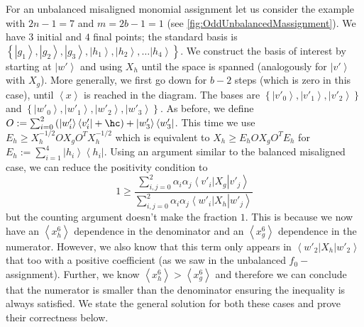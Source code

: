 \documentclass{theoretics}
\newcommand{\atul}[1]{#1} %
\begin{document}
For an
unbalanced misaligned monomial assignment let us consider the example with $2n-1=7$
and $m=2b-1=1$ \atul{(see  \cref{fig:OddUnbalancedMassignment})}. We have $3$ initial and $4$
final points; the standard basis is\\ $\left\{ \left|g_{1}\right\rangle ,\left|g_{2}\right\rangle ,\left|g_{3}\right\rangle ,\left|h_{1}\right\rangle ,\left|h_{2}\right\rangle ,\dots\left|h_{4}\right\rangle \right\}$.
We construct the basis of interest by starting at
$\left|w'\right\rangle $
and using $X_{h}$ until the space is spanned (analogously for $\left|v'\right\rangle $ with $X_g$). More generally, we
first go down for $b-2$ steps (which is zero in this case), until
$\left\langle x\right\rangle $ is reached in the diagram. The bases
are $\left\{ \left|v'_{0}\right\rangle ,\left|v'_{1}\right\rangle ,\left|v'_{2}\right\rangle \right\} $
and $\left\{ \left|w'_{0}\right\rangle ,\left|w'_{1}\right\rangle ,\left|w'_{2}\right\rangle ,\left|w'_{3}\right\rangle \right\} $.
As before, we define $O:=\sum_{i=0}^{2}\left(\left|w'_{i}\right\rangle \left\langle v'_{i}\right|+\hc\right)+\left|w'_{3}\right\rangle \left\langle w'_{3}\right|$.
This time we
use $E_{h}\ge X_{h}^{-1/2}OX_{g}O^{T}X_{h}^{-1/2}$ which is equivalent
to $X_{h}\ge E_{h}OX_{g}O^{T}E_{h}$ for $E_{h}:=\sum_{i=1}^{4}\left|h_{i}\right\rangle \left\langle h_{i}\right|$.
Using an argument similar to the balanced misaligned case, we can
reduce the positivity condition to
\begin{displaymath}
  1\ge\frac{\sum_{i,j=0}^{2}\alpha_{i}\alpha_{j}\left\langle v'_{i}\right|X_{g}\left|v'_{j}\right\rangle }{\sum_{i,j=0}^{2}\alpha_{i}\alpha_{j}\left\langle w'_{i}\right|X_{h}\left|w'_{j}\right\rangle }
\end{displaymath}
but the counting argument doesn't make the fraction $1$. This is
because we now have an $\left\langle x_{h}^{6}\right\rangle $ dependence
in the denominator and an $\left\langle x_{g}^{6}\right\rangle $ dependence
in the numerator. However, we also know that this term only appears
in $\left\langle w'_{2}\right|X_{h}\left|w'_{2}\right\rangle $ that
too with a positive coefficient (as we saw in the unbalanced $f_{0}-$assignment). Further, we know $\left\langle x_{h}^{6}\right\rangle >\left\langle x_{g}^{6}\right\rangle $
and therefore we can conclude that the numerator is smaller than the
denominator ensuring the inequality is always satisfied.
We state the general solution for both these cases and prove their
correctness below.
\end{document}
